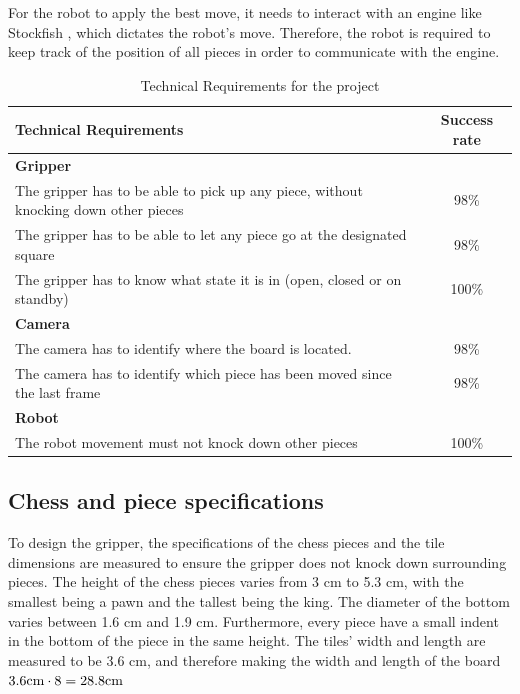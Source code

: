 For the robot to apply the best move, it needs to interact with an engine like Stockfish \cite{Stockfish}, which dictates the robot's move. Therefore, the robot is required to keep track of the position of all pieces in order to communicate with the engine.
\begin{table}[b]
    \centering
    \begin{tabular}{p{13cm}|c}
        \toprule
        \rowcolor{gray!30}
        \textbf{Technical Requirements} & \textbf{Success rate} \\
        \midrule

        \rowcolor{gray!15}
        \textbf{Gripper} &\\
        The gripper has to be able to pick up any piece, without knocking down other pieces & 98\%\\
        The gripper has to be able to let any piece go at the designated square & 98\%\\
        The gripper has to know what state it is in (open, closed or on standby) & 100\% \\
  
        
        \rowcolor{gray!15}
        \textbf{Camera} &\\
        The camera has to identify where the board is located. & 98\% \\
        The camera has to identify which piece has been moved since the last frame & 98\% \\
        
        \rowcolor{gray!15}
        \textbf{Robot} &\\
        The robot movement must not knock down other pieces & 100\% \\
        
        \bottomrule
    \end{tabular}
    \caption{Technical Requirements for the project}
    \label{tab:project_requirements}
\end{table}

\subsection{Chess and piece specifications}
\label{sec:ChessSpecs}
To design the gripper, the specifications of the chess pieces and the tile dimensions are measured to ensure the gripper does not knock down surrounding pieces. 
The height of the chess pieces varies from 3 cm to 5.3 cm, with the smallest being a pawn and the tallest being the king. The diameter of the bottom varies between 1.6 cm and 1.9 cm. Furthermore, every piece have a small indent in the bottom of the piece in the same height.
The tiles' width and length are measured to be 3.6 cm, and therefore making the width and length of the board $3.6 \space \text{cm} \cdot 8 = 28.8 \text{cm}$

